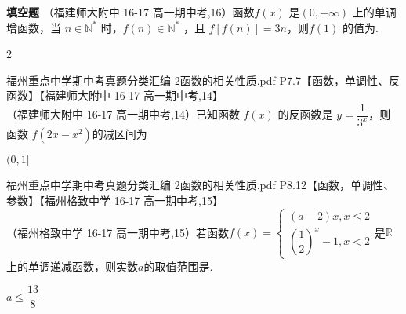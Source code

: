 \begin{exercise}{\bf 填空题}
      （福建师大附中 16-17 高一期中考,16）函数$f(x)$ 是$(0,+\infty)$ 上的单调增函数，当 $n\in \mathbb{N}^*$ 时，$f(n)\in\mathbb{N}^*$ ，且 $f[f(n) ] =3n$，则$f(1)$ 的值为\tk.
      \begin{answer}2\end{answer}
    \item 福州重点中学期中考真题分类汇编 2函数的相关性质.pdf P7.7【函数，单调性、反函数】【福建师大附中 16-17 高一期中考,14】\\
     （福建师大附中 16-17 高一期中考,14）已知函数 $f(x)$ 的反函数是 $y=\dfrac{1}{3^x}$，则函数 $f(2x-x^2) $的减区间为\tk
     \begin{answer}
       $(0,1]$
     \end{answer}
    \item 福州重点中学期中考真题分类汇编 2函数的相关性质.pdf P8.12【函数，单调性、参数】【福州格致中学 16-17 高一期中考,15】\\
     （福州格致中学 16-17 高一期中考,15）若函数$f(x)=\begin{cases}(a-2)x,x\leq2\\(\dfrac{1}{2})^x-1,x<2\end{cases}$是$\mathbb{R}$上的单调递减函数，则实数$a$的取值范围是\tk.
     \begin{answer}
       $a\leq\dfrac{13}{8}$
     \end{answer}
    \end{exercise}
